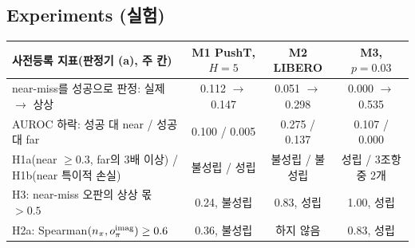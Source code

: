 \documentclass[nouppercase]{kaia}
\begin{document}
\begin{mdframed}
\subsection{Experiments (실험)}
{\centering\footnotesize
\setlength{\tabcolsep}{4pt}
\begin{tabular}{lccc}
\toprule
사전등록 지표(판정기 (a), 주 칸) & M1 PushT, $H=5$ & M2 LIBERO & M3, $p=0.03$ \\
\midrule
near-miss를 성공으로 판정: 실제 $\rightarrow$ 상상 & 0.112 $\rightarrow$ 0.147 & 0.051 $\rightarrow$ 0.298 & 0.000 $\rightarrow$ 0.535 \\
AUROC 하락: 성공 대 near / 성공 대 far & 0.100 / 0.005 & 0.275 / 0.137 & 0.107 / 0.000 \\
H1a(near $\ge 0.3$, far의 3배 이상) / H1b(near 특이적 손실) & 불성립 / 성립 & 불성립 / 불성립 & 성립 / 3조항 중 2개 \\
H3: near-miss 오판의 상상 몫 $>0.5$ & 0.24, 불성립 & 0.83, 성립 & 1.00, 성립 \\
H2a: Spearman$(n_\pi, o^{\rm imag}_\pi)\ge 0.6$ & 0.36, 불성립 & 하지 않음 & 0.83, 성립 \\
\bottomrule
\end{tabular}\par
{}\label{tab:tests}\par}
\smallskip


\end{mdframed}
\end{document}
